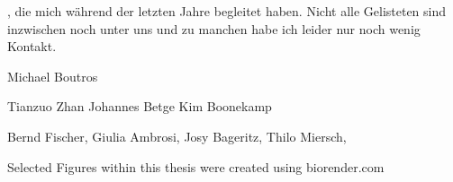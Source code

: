 
, die mich während der letzten Jahre begleitet haben. Nicht alle Gelisteten sind inzwischen noch unter uns und zu manchen habe ich leider nur noch wenig Kontakt.

Michael Boutros


Tianzuo Zhan 
Johannes Betge 
Kim Boonekamp 

Bernd Fischer, Giulia Ambrosi, Josy Bageritz, Thilo Miersch, 


Selected Figures within this thesis were created using biorender.com